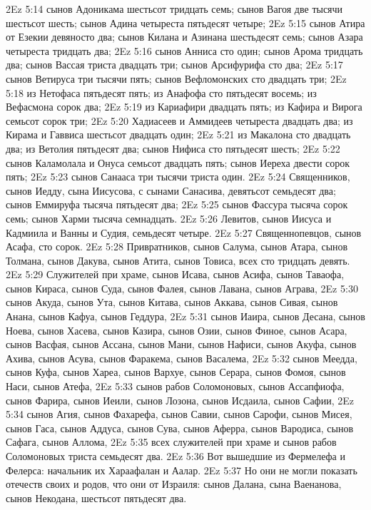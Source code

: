 \vs 2Ez 5:14 сынов Адоникама шестьсот тридцать семь; сынов Вагоя две тысячи шестьсот шесть; сынов Адина четыреста пятьдесят четыре;
\vs 2Ez 5:15 сынов Атира от Езекии девяносто два; сынов Килана и Азинана шестьдесят семь; сынов Азара четыреста тридцать два;
\vs 2Ez 5:16 сынов Анниса сто один; сынов Арома тридцать два; сынов Вассая триста двадцать три; сынов Арсифурифа сто два;
\vs 2Ez 5:17 сынов Ветируса три тысячи пять; сынов Вефломонских сто двадцать три;
\vs 2Ez 5:18 из Нетофаса пятьдесят пять; из Анафофа сто пятьдесят восемь; из Вефасмона сорок два;
\vs 2Ez 5:19 из Кариафири двадцать пять; из Кафира и Вирога семьсот сорок три;
\vs 2Ez 5:20 Хадиасеев и Аммидеев четыреста двадцать два; из Кирама и Гаввиса шестьсот двадцать один;
\vs 2Ez 5:21 из Макалона сто двадцать два; из Ветолия пятьдесят два; сынов Нифиса сто пятьдесят шесть;
\vs 2Ez 5:22 сынов Каламолала и Онуса семьсот двадцать пять; сынов Иереха двести сорок пять;
\vs 2Ez 5:23 сынов Санааса три тысячи триста один.
\vs 2Ez 5:24 Священников, сынов Иедду, сына Иисусова, с сынами Санасива, девятьсот семьдесят два; сынов Еммируфа тысяча пятьдесят два;
\vs 2Ez 5:25 сынов Фассура тысяча сорок семь; сынов Харми тысяча семнадцать.
\vs 2Ez 5:26 Левитов, сынов Иисуса и Кадмиила и Ванны и Судия, семьдесят четыре.
\vs 2Ez 5:27 Священнопевцов, сынов Асафа, сто сорок.
\vs 2Ez 5:28 Привратников, сынов Салума, сынов Атара, сынов Толмана, сынов Дакува, сынов Атита, сынов Товиса, всех сто тридцать девять.
\vs 2Ez 5:29 Служителей при храме, сынов Исава, сынов Асифа, сынов Таваофа, сынов Кираса, сынов Суда, сынов Фалея, сынов Лавана, сынов Аграва,
\vs 2Ez 5:30 сынов Акуда, сынов Ута, сынов Китава, сынов Аккава, сынов Сивая, сынов Анана, сынов Кафуа, сынов Геддура,
\vs 2Ez 5:31 сынов Иаира, сынов Десана, сынов Ноева, сынов Хасева, сынов Казира, сынов Озии, сынов Финое, сынов Асара, сынов Васфая, сынов Ассана, сынов Мани, сынов Нафиси, сынов Акуфа, сынов Ахива, сынов Асува, сынов Фаракема, сынов Васалема,
\vs 2Ez 5:32 сынов Меедда, сынов Куфа, сынов Хареа, сынов Вархуе, сынов Серара, сынов Фомоя, сынов Наси, сынов Атефа,
\vs 2Ez 5:33 сынов рабов Соломоновых, сынов Ассапфиофа, сынов Фарира, сынов Иеили, сынов Лозона, сынов Исдаила, сынов Сафии,
\vs 2Ez 5:34 сынов Агия, сынов Фахарефа, сынов Савии, сынов Сарофи, сынов Мисея, сынов Гаса, сынов Аддуса, сынов Сува, сынов Аферра, сынов Вародиса, сынов Сафага, сынов Аллома,
\vs 2Ez 5:35 всех служителей при храме и сынов рабов Соломоновых триста семьдесят два.
\rsbpar\vs 2Ez 5:36 Вот вышедшие из Фермелефа и Фелерса: начальник их Хараафалан и Аалар.
\vs 2Ez 5:37 Но они не могли показать отечеств своих и родов, что они от Израиля: сынов Далана, сына Ваенанова, сынов Некодана, шестьсот пятьдесят два.

